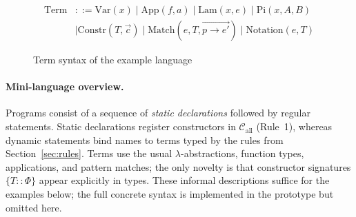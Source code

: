\documentclass[a4paper, anonymous, UKenglish,cleveref, autoref, thm-restate]{lipics-v2021}
\begin{document}
\begin{figure}[!ht]
\begin{align*}
\text{Term} &::= \text{Var}(x) \mid \text{App}(f, a) \mid \text{Lam}(x, e) \mid \text{Pi}(x, A, B) \\
&\mid \text{Constr}(T, \overrightarrow{c}) \mid \text{Match}(e, T, \overrightarrow{p \to e'}) \mid \text{Notation}(e, T)
\end{align*}
	
\caption{Term syntax of the example language}
\label{fig:term-syntax}
\end{figure}

\paragraph{Mini-language overview.}
Programs consist of a sequence of \emph{static declarations} followed by regular statements. Static declarations register constructors in $\mathcal{C}_{\text{all}}$ (Rule~1), whereas dynamic statements bind names to terms typed by the rules from Section~\ref{sec:rules}. Terms use the usual $\lambda$-abstractions, function types, applications, and pattern matches; the only novelty is that constructor signatures $\{T :: \Phi\}$ appear explicitly in types. These informal descriptions suffice for the examples below; the full concrete syntax is implemented in the prototype but omitted here.
\end{document}
